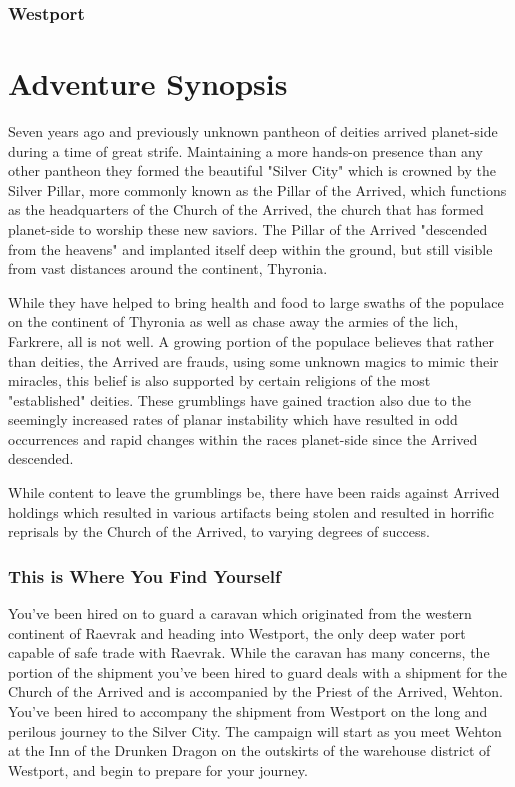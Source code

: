 \documentclass[letterpaper,twocolumn,openany,nodeprecatedcode]{dndbook}
\begin{document}
\subsection{Westport}


\twocolumn
\chapter{Adventure Synopsis }
Seven years ago and previously unknown pantheon of deities arrived planet-side during a time of great strife. Maintaining a more hands-on presence than any other pantheon they formed the beautiful "Silver City" which is crowned by the Silver Pillar, more commonly known as the Pillar of the Arrived, which functions as the headquarters of the Church of the Arrived, the church that has formed planet-side to worship these new saviors. The Pillar of the Arrived "descended from the heavens" and implanted itself deep within the ground, but still visible from vast distances around the continent, Thyronia.


While they have helped to bring health and food to large swaths of the populace on the continent of Thyronia as well as chase away the armies of the lich, Farkrere, all is not well. A growing portion of the populace believes that rather than deities, the Arrived are frauds, using some unknown magics to mimic their miracles, this belief is also supported by certain religions of the most "established" deities. These grumblings have gained traction also due to the seemingly increased rates of planar instability which have resulted in odd occurrences and rapid changes within the races planet-side since the Arrived descended.


While content to leave the grumblings be, there have been raids against Arrived holdings which resulted in various artifacts being stolen and resulted in horrific reprisals by the Church of the Arrived, to varying degrees of success.


\subsection{This is Where You Find Yourself}
You've been hired on to guard a caravan which originated from the western continent of Raevrak and heading into Westport, the only deep water port capable of safe trade with Raevrak. While the caravan has many concerns, the portion of the shipment you've been hired to guard deals with a shipment for the Church of the Arrived and is accompanied by the Priest of the Arrived, Wehton. You've been hired to accompany the shipment from Westport on the long and perilous journey to the Silver City.
The campaign will start as you meet Wehton at the Inn of the Drunken Dragon on the outskirts of the warehouse district of Westport, and begin to prepare for your journey.
\end{document}
